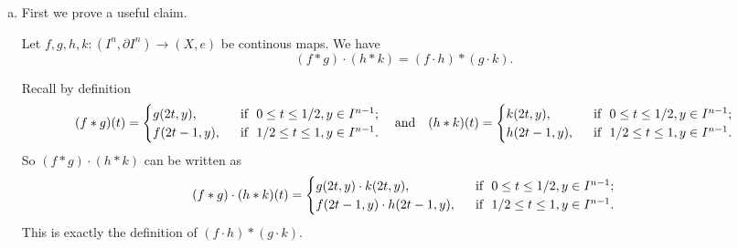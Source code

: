 \documentclass[a4paper, 12pt]{article}
\begin{document}
\begin{solution}
\begin{enumerate}[(a)]
\item 
First we prove a useful claim. 
\begin{claim}
Let \(f,g,h,k:(I^n,\partial I^n)\rightarrow (X,e)\) be continous maps. We have 
\[(f*g)\cdot (h*k)=(f\cdot h)*(g\cdot k).\]
\end{claim}
\begin{claimproof}
Recall by definition 
\[(f*g)(t)=\begin{cases}
	g(2t,y),&\ \ \text{if}\ \  0\leq t\leq 1/2, y\in I^{n-1};\\
	f(2t-1,y),&\ \ \text{if}\ \  1/2\leq t\leq 1, y\in I^{n-1}.
\end{cases}\ \ \ \text{and}\ \ \ (h*k)(t)=\begin{cases}
    k(2t,y),&\ \ \text{if}\ \  0\leq t\leq 1/2, y\in I^{n-1};\\ 
	h(2t-1,y),&\ \ \text{if}\ \  1/2\leq t\leq 1, y\in I^{n-1}.
\end{cases}\]
So \((f*g)\cdot (h*k)\) can be written as 
\[(f*g)\cdot (h*k)(t)=\begin{cases}
	g(2t,y)\cdot k(2t,y),&\ \ \text{if}\ \  0\leq t\leq 1/2, y\in I^{n-1};\\ 
    f(2t-1,y)\cdot h(2t-1,y),&\ \ \text{if}\ \  1/2\leq t\leq 1, y\in I^{n-1}.
\end{cases}\]
This is exactly the definition of \((f\cdot h)*(g\cdot k)\).
\end{claimproof}


\end{enumerate}
\end{solution}
\end{document}
